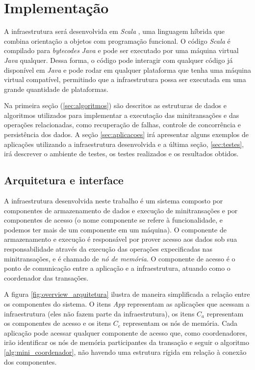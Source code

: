 \documentclass[11pt,twoside,a4paper]{book}
\begin{document}
\chapter{Implementação}
\label{chap:implementacao}

A infraestrutura será desenvolvida em \emph{Scala} \cite{scala}, uma linguagem híbrida que combina orientação a objetos com programação funcional. O código \emph{Scala} é compilado para \emph{bytecodes} \emph{Java} e pode ser executado por uma máquina virtual \emph{Java} qualquer. Dessa forma, o código pode interagir com qualquer código já disponível em \emph{Java} e pode rodar em qualquer plataforma que tenha uma máquina virtual compatível, permitindo que a infraestrutura possa ser executada em uma grande quantidade de plataformas.

Na primeira seção (\ref{sec:algoritmos}) são descritos as estruturas de dados e algoritmos utilizados para implementar a executação das minitransações e das operações relacionadas, como recuperação de falhas, controle de concorrência e persistência dos dados. A seção \ref{sec:aplicacoes} irá apresentar alguns exemplos de aplicações utilizando a infraestrutura desenvolvida e a última seção, \ref{sec:testes}, irá descrever o ambiente de testes, os testes realizados e os resultados obtidos.

\section{Arquitetura e interface}
\label{sec:arquitetura}

A infraestrutura desenvolvida neste trabalho é um sistema composto por componentes de armazenamento de dados e execução de minitransações e por componentes de acesso (o nome componente se refere à funcionalidade, e podemos ter mais de um componente em um máquina). O componente de armazenamento e execução é responsável por prover acesso aos dados sob sua responsabilidade através da execução das operações expecificadas nas minitransações, e é chamado de \emph{nó de memória}. O componente de acesso é o ponto de comunicação entre a aplicação e a infraestrutura, atuando como o coordenador das transações.

A figura \ref{fig:overview_arquitetura} ilustra de maneira simplificada a relação entre os componentes do sistema. O itens \emph{App} representam as aplicações que acessam a infraestrutura (eles não fazem parte da infraestrutura), os itens \emph{$C_a$} representam os componentes de acesso e os itens \emph{$C_e$} representam os nós de memória. Cada aplicação pode acessar qualquer componente de acesso que, como coordenadores, irão identificar os nós de memória participantes da transação e seguir o algoritmo \ref{alg:mini_coordenador}, não havendo uma estrutura rígida em relação à conexão dos componentes.
\end{document}
